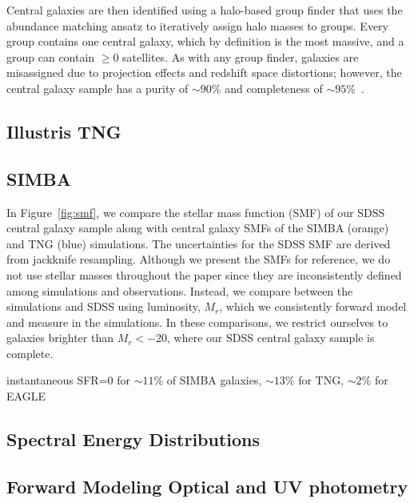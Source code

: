 Central galaxies are then identified using a halo-based group finder that uses
the abundance matching ansatz to iteratively  assign halo masses to groups.
Every group contains one central galaxy, which by definition is the most
massive, and a group can contain $\ge0$ satellites. As with any group finder,
galaxies are misassigned due to projection effects and redshift space
distortions; however, the central galaxy sample has a purity of ${\sim}90\%$
and completeness of ${\sim}95\%$~\citep{tinker2018}. 

\subsection{Illustris TNG} \label{sec:tng}

\subsection{SIMBA} \label{sec:simba}

In Figure~\ref{fig:smf}, we compare the stellar mass function (SMF) of our SDSS
central galaxy sample along with central galaxy SMFs of the SIMBA (orange) and
TNG (blue) simulations. The uncertainties for the SDSS SMF are derived from
jackknife resampling. Although we present the SMFs for reference, we do not use
stellar masses throughout the paper since they are inconsistently defined among
simulations and observations. Instead, we compare between the simulations and
SDSS using luminosity, $M_r$, which we consistently forward model and measure
in the simulations. In these comparisons, we restrict ourselves to galaxies
brighter than $M_r < -20$, where our SDSS central galaxy sample is complete. 

instantaneous SFR=0 for $\sim11\%$ of SIMBA galaxies, $\sim13\%$ for TNG,
$\sim2\%$ for EAGLE

\subsection{Spectral Energy Distributions} \label{sec:sed}

\subsection{Forward Modeling Optical and UV photometry} \label{sec:fm} 

